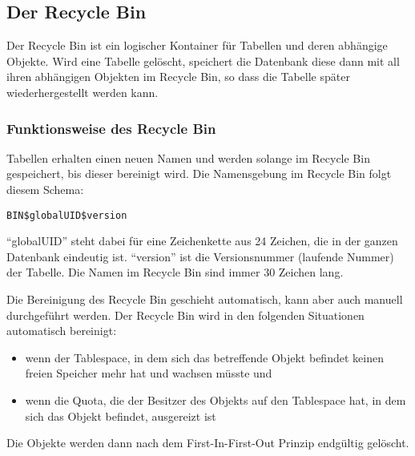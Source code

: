      \subsection{Der Recycle Bin}
        Der Recycle Bin ist ein logischer Kontainer f\"ur Tabellen und deren abh\"angige Objekte. Wird eine Tabelle gel\"oscht, speichert die Datenbank diese dann mit all ihren abh\"angigen Objekten im Recycle Bin, so dass die Tabelle sp\"ater wiederhergestellt werden kann.
        \subsubsection{Funktionsweise des Recycle Bin}
          Tabellen erhalten einen neuen Namen und werden solange im Recycle Bin gespeichert, bis dieser bereinigt wird. Die Namensgebung im Recycle Bin folgt diesem Schema:

          \verb+BIN$globalUID$version+

          \enquote{globalUID} steht dabei f\"ur eine Zeichenkette aus 24 Zeichen, die in der ganzen Datenbank eindeutig ist. \enquote{version} ist die Versionsnummer (laufende Nummer) der Tabelle. Die Namen im Recycle Bin sind immer 30 Zeichen lang.

          Die Bereinigung des Recycle Bin geschieht automatisch, kann aber auch manuell durchgef\"uhrt werden. Der Recycle Bin wird in den folgenden Situationen automatisch bereinigt:
          \begin{itemize}
            \item wenn der Tablespace, in dem sich das betreffende Objekt befindet keinen freien Speicher mehr hat und wachsen m\"usste und
            \item wenn die Quota, die der Besitzer des Objekts auf den Tablespace hat, in dem sich das Objekt befindet, ausgereizt ist
          \end{itemize}
          Die Objekte werden dann nach dem First-In-First-Out Prinzip endg\"ultig gel\"oscht.

